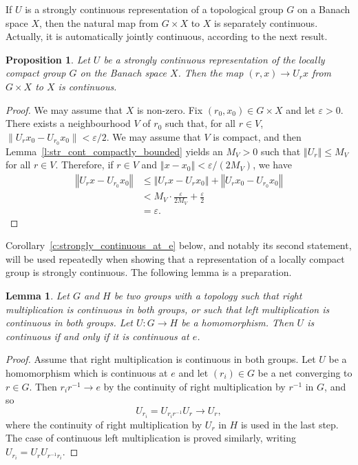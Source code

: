 \documentclass{amsart}
\theoremstyle{plain}
\newtheorem{prop}[theorem]{Proposition}
\newtheorem{lemma}[theorem]{Lemma}
\theoremstyle{definition}
\numberwithin{equation}{section}
\begin{document}
If $U$ is a strongly continuous representation of a topological group $G$ on a Banach space $X$, then the natural map from $G\times X$ to $X$ is separately continuous. Actually, it is automatically jointly continuous, according to the next result.

\begin{prop}\label{p:jointly_continuous}
Let $U$ be a strongly continuous representation of the locally compact group $G$ on the Banach space $X$. Then the map $(r,x)\to U_r x$ from $G\times X$ to $X$ is continuous.
\end{prop}

\begin{proof}
We may assume that $X$ is non-zero.
Fix $(r_0,x_0)\in G\times X$ and let ${\varepsilon}>0$. There exists a neighbourhood $V$ of $r_0$ such that, for all $r\in V$, $\|U_r x_0-U_{r_0} x_0\|< {\varepsilon}/2$. We may assume that $V$ is compact, and then Lemma~\ref{l:str_cont_compactly_bounded} yields an $M_V>0$ such that ${\left\Vert {U_r} \right\Vert}\leq M_V$ for all $r\in V$. Therefore, if $r\in V$ and ${\left\Vert {x-x_0} \right\Vert}< {\varepsilon}/(2M_V)$, we have
\begin{align*}
{\left\Vert {U_r x-U_{r_0} x_0} \right\Vert}&\leq {\left\Vert {U_r x - U_r x_0} \right\Vert}+{\left\Vert {U_r x_0-U_{r_0} x_0} \right\Vert}\\
&<M_V\cdot\frac{\varepsilon}{2M_V} + \frac{\varepsilon}{2}\\
&={\varepsilon}.
\end{align*}
\end{proof}

Corollary~\ref{c:strongly_continuous_at_e} below, and notably its second statement, will be used repeatedly when showing that a representation of a locally compact group is strongly continuous. The following lemma is a preparation.

\begin{lemma}\label{l:continuity_between_two_groups}
 Let $G$ and $H$ be two groups with a topology such that right multiplication is continuous in both groups, or such that left multiplication is continuous in both groups. Let $U: G \to H$ be a homomorphism. Then $U$ is continuous if and only if it is continuous at $e$.
\end{lemma}

\begin{proof}
Assume that right multiplication is continuous in both groups. Let $U$ be a homomorphism which is continuous at $e$ and let $(r_i) \in G$ be a net converging to $r\in G$. Then $r_i r^{-1} \to e$ by the continuity of right multiplication by $r^{-1}$ in $G$, and so
\[ U_{r_i} = U_{r_i r^{-1}} U_r \to U_r, \]
where the continuity of right multiplication by $U_r$ in $H$ is used in the last step. The case of continuous left multiplication is proved similarly, writing $U_{r_i}=U_rU_{r^{-1}r_i}$.
\end{proof}
\end{document}
